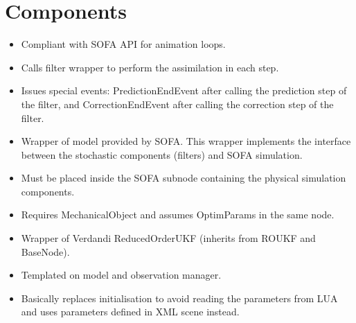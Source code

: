 \documentclass[10pt]{article}
\begin{document}
\section{Components}
{\large \al}
\begin{itemize}
\item Compliant with SOFA API for animation loops. 
\item Calls filter wrapper to perform the assimilation in each step.
\item Issues special events: PredictionEndEvent after calling the prediction step of the filter, and CorrectionEndEvent after calling the correction step of the filter.
\end{itemize}
\medskip
{\large\smw}
\begin{itemize}
\item Wrapper of model provided by SOFA. This wrapper implements the interface between the stochastic components (filters) and SOFA simulation.
\item Must be placed inside the SOFA subnode containing the physical simulation components.
\item Requires MechanicalObject and assumes OptimParams in the same node.
\end{itemize}
\medskip
{\large \sroukf}
\begin{itemize}
\item Wrapper of Verdandi ReducedOrderUKF (inherits from ROUKF and BaseNode).
\item Templated on model and observation manager.
\item Basically replaces initialisation to avoid reading the parameters from LUA and uses parameters defined in XML scene instead. 
\end{itemize}
\medskip
{\large\opr}
\end{document}
